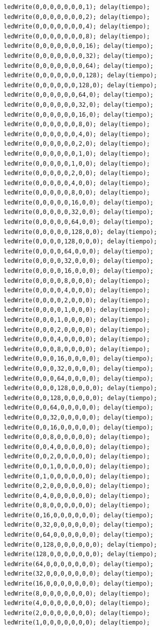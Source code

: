 \documentclass{article}
\begin{document}
\begin{verbatim}
  ledWrite(0,0,0,0,0,0,0,1); delay(tiempo);
  ledWrite(0,0,0,0,0,0,0,2); delay(tiempo);
  ledWrite(0,0,0,0,0,0,0,4); delay(tiempo);
  ledWrite(0,0,0,0,0,0,0,8); delay(tiempo);
  ledWrite(0,0,0,0,0,0,0,16); delay(tiempo);
  ledWrite(0,0,0,0,0,0,0,32); delay(tiempo);
  ledWrite(0,0,0,0,0,0,0,64); delay(tiempo);
  ledWrite(0,0,0,0,0,0,0,128); delay(tiempo);
  ledWrite(0,0,0,0,0,0,128,0); delay(tiempo);
  ledWrite(0,0,0,0,0,0,64,0); delay(tiempo);
  ledWrite(0,0,0,0,0,0,32,0); delay(tiempo);
  ledWrite(0,0,0,0,0,0,16,0); delay(tiempo);
  ledWrite(0,0,0,0,0,0,8,0); delay(tiempo);
  ledWrite(0,0,0,0,0,0,4,0); delay(tiempo);
  ledWrite(0,0,0,0,0,0,2,0); delay(tiempo);
  ledWrite(0,0,0,0,0,0,1,0); delay(tiempo);
  ledWrite(0,0,0,0,0,1,0,0); delay(tiempo);
  ledWrite(0,0,0,0,0,2,0,0); delay(tiempo);
  ledWrite(0,0,0,0,0,4,0,0); delay(tiempo);
  ledWrite(0,0,0,0,0,8,0,0); delay(tiempo);
  ledWrite(0,0,0,0,0,16,0,0); delay(tiempo);
  ledWrite(0,0,0,0,0,32,0,0); delay(tiempo);
  ledWrite(0,0,0,0,0,64,0,0); delay(tiempo);
  ledWrite(0,0,0,0,0,128,0,0); delay(tiempo);
  ledWrite(0,0,0,0,128,0,0,0); delay(tiempo);
  ledWrite(0,0,0,0,64,0,0,0); delay(tiempo);
  ledWrite(0,0,0,0,32,0,0,0); delay(tiempo);
  ledWrite(0,0,0,0,16,0,0,0); delay(tiempo);
  ledWrite(0,0,0,0,8,0,0,0); delay(tiempo);
  ledWrite(0,0,0,0,4,0,0,0); delay(tiempo);
  ledWrite(0,0,0,0,2,0,0,0); delay(tiempo);
  ledWrite(0,0,0,0,1,0,0,0); delay(tiempo);
  ledWrite(0,0,0,1,0,0,0,0); delay(tiempo);
  ledWrite(0,0,0,2,0,0,0,0); delay(tiempo);
  ledWrite(0,0,0,4,0,0,0,0); delay(tiempo);
  ledWrite(0,0,0,8,0,0,0,0); delay(tiempo);
  ledWrite(0,0,0,16,0,0,0,0); delay(tiempo);
  ledWrite(0,0,0,32,0,0,0,0); delay(tiempo);
  ledWrite(0,0,0,64,0,0,0,0); delay(tiempo);
  ledWrite(0,0,0,128,0,0,0,0); delay(tiempo);
  ledWrite(0,0,128,0,0,0,0,0); delay(tiempo);
  ledWrite(0,0,64,0,0,0,0,0); delay(tiempo);
  ledWrite(0,0,32,0,0,0,0,0); delay(tiempo);
  ledWrite(0,0,16,0,0,0,0,0); delay(tiempo);
  ledWrite(0,0,8,0,0,0,0,0); delay(tiempo);
  ledWrite(0,0,4,0,0,0,0,0); delay(tiempo);
  ledWrite(0,0,2,0,0,0,0,0); delay(tiempo);
  ledWrite(0,0,1,0,0,0,0,0); delay(tiempo);
  ledWrite(0,1,0,0,0,0,0,0); delay(tiempo);
  ledWrite(0,2,0,0,0,0,0,0); delay(tiempo);
  ledWrite(0,4,0,0,0,0,0,0); delay(tiempo);
  ledWrite(0,8,0,0,0,0,0,0); delay(tiempo);
  ledWrite(0,16,0,0,0,0,0,0); delay(tiempo);
  ledWrite(0,32,0,0,0,0,0,0); delay(tiempo);
  ledWrite(0,64,0,0,0,0,0,0); delay(tiempo);
  ledWrite(0,128,0,0,0,0,0,0); delay(tiempo);
  ledWrite(128,0,0,0,0,0,0,0); delay(tiempo);
  ledWrite(64,0,0,0,0,0,0,0); delay(tiempo);
  ledWrite(32,0,0,0,0,0,0,0); delay(tiempo);
  ledWrite(16,0,0,0,0,0,0,0); delay(tiempo);
  ledWrite(8,0,0,0,0,0,0,0); delay(tiempo);
  ledWrite(4,0,0,0,0,0,0,0); delay(tiempo);
  ledWrite(2,0,0,0,0,0,0,0); delay(tiempo);
  ledWrite(1,0,0,0,0,0,0,0); delay(tiempo);
  

\end{verbatim}
\end{document}
